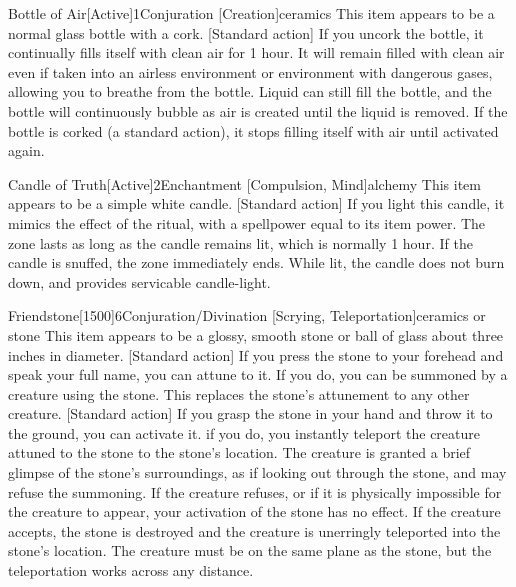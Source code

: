         \begin{magicitemdef}{Bottle of Air}[Active]{1}{Conjuration [Creation]}{ceramics}
            This item appears to be a normal glass bottle with a cork.
            [Standard action] If you uncork the bottle, it continually fills itself with clean air for 1 hour.
            It will remain filled with clean air even if taken into an airless environment or environment with dangerous gases, allowing you to breathe from the bottle.
            Liquid can still fill the bottle, and the bottle will continuously bubble as air is created until the liquid is removed.
            If the bottle is corked (a standard action), it stops filling itself with air until activated again.
        \end{magicitemdef}

        \begin{magicitemdef}{Candle of Truth}[Active]{2}{Enchantment [Compulsion, Mind]}{alchemy}
            This item appears to be a simple white candle.
            [Standard action] If you light this candle, it mimics the effect of the  ritual, with a spellpower equal to its item power.
            The zone lasts as long as the candle remains lit, which is normally 1 hour.
            If the candle is snuffed, the zone immediately ends.
            While lit, the candle does not burn down, and provides servicable candle-light.
        \end{magicitemdef}

        \begin{magicitemdef}{Friendstone}[1500]{6}{Conjuration/Divination [Scrying, Teleportation]}{ceramics or stone}
            This item appears to be a glossy, smooth stone or ball of glass about three inches in diameter.
            [Standard action] If you press the stone to your forehead and speak your full name, you can attune to it.
            If you do, you can be summoned by a creature using the stone.
            This replaces the stone's attunement to any other creature.
            [Standard action] If you grasp the stone in your hand and throw it to the ground, you can activate it.
            if you do, you instantly teleport the creature attuned to the stone to the stone's location.
            The creature is granted a brief glimpse of the stone's surroundings, as if looking out through the stone, and may refuse the summoning.
            If the creature refuses, or if it is physically impossible for the creature to appear, your activation of the stone has no effect.
            If the creature accepts, the stone is destroyed and the creature is unerringly teleported into the stone's location.
            The creature must be on the same plane as the stone, but the teleportation works across any distance.
        \end{magicitemdef}

